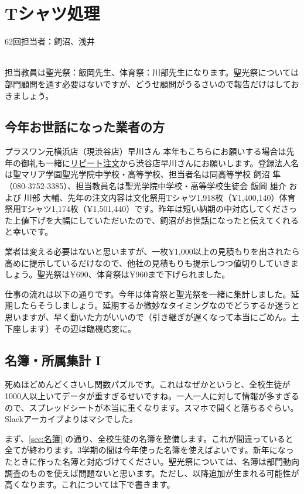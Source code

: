 \documentclass[dvipdfmx,jb5]{jreport}
\newcommand{\link}[2]{\href{#2}{#1}}
\begin{document}
\section{Tシャツ処理}
62回担当者：飼沼、浅井

\\

担当教員は聖光祭：飯岡先生、体育祭：川部先生になります。聖光祭については部門顧問を通す必要はないですが、どうせ顧問がうるさいので報告だけはしておきましょう。

\subsection{今年お世話になった業者の方}
プラスワン元横浜店（現渋谷店）早川さん
本年もこちらにお願いする場合は先年の御礼も一緒に\link{リピート注文}{https://www.p1-intl.com/contents/repeat.html}から渋谷店早川さんにお願いします。登録法人名は聖マリア学園聖光学院中学校・高等学校、担当者名は同高等学校 飼沼 隼（080-3752-3385）、担当教員名は聖光学院中学校・高等学校生徒会 飯岡 雄介 および 川部 大輔、先年の注文内容は文化祭用Tシャツ1,918枚（¥1,400,140）体育祭用Tシャツ1,174枚（¥1,501,440）です。昨年は短い納期の中対応してくださった上値下げを大幅にしていただいたので、飼沼がお世話になったと伝えてくれると幸いです。

業者は変える必要はないと思いますが、一枚¥1,000以上の見積もりを出されたら高めに提示しているだけなので、他社の見積もりも提示しつつ値切りしていきましょう。聖光祭は¥690、体育祭は¥960まで下げられました。

仕事の流れは以下の通りです。今年は体育祭と聖光祭を一緒に集計しました。延期したらそうしましょう。延期するか微妙なタイミングなのでどうするか迷うと思いますが、早く動いた方がいいので（引き継ぎが遅くなって本当にごめん。土下座します）その辺は臨機応変に。

\subsection{名簿・所属集計 I}
死ぬほどめんどくさいし関数パズルです。これはなぜかというと、全校生徒が1000人以上いてデータが重すぎるせいですね。一人一人に対して情報が多すぎるので、スプレッドシートが本当に重くなります。スマホで開くと落ちるぐらい。Slackアーカイブよりはマシでした。

まず、\ref{sec:名簿} の通り、全校生徒の名簿を整備します。これが間違っていると全てが終わります。3学期の間は今年使った名簿を使えばよいです。新年になったときに作った名簿と対応づけてください。聖光祭については、名簿は部門動向調査のものを使えば問題ないと思います。ただし、以降追加が生まれる可能性が高くなります。これについては下で書きます。
\end{document}
